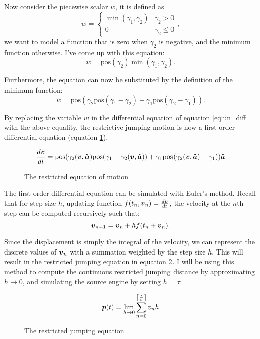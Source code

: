 Now consider the piecewise scalar $w$, it is defined as
\[
    w = \begin{cases}
        \min(\gamma_1, \gamma_2) & \gamma_2 > 0\\
        0 & \gamma_2 \le 0
    \end{cases},
\]
we want to model a function that is zero when $\gamma_2$ is negative, and the minimum function otherwise. I've come up with this equation:
\[
    w = \text{pos}(\gamma_2)\min(\gamma_1, \gamma_2).
\]

Furthermore, the equation can now be substituted by the definition of the minimum function:
\[
    w = \text{pos}(\gamma_2 \text{pos}(\gamma_1 - \gamma_2) + \gamma_1 \text{pos}(\gamma_2 - \gamma_1)).
\]

By replacing the variable $w$ in the differential equation of equation \ref{eq:un_diff} with the above equality, the restrictive jumping motion is now a first order differential equation (equation \ref{eq:reom}).

\begin{figure}[H]
    \centering
    \[
        \frac{d\tv}{dt} = \text{pos}(\gamma_2(\tv, \tunit{a}) \text{pos}(\gamma_1 - \gamma_2(\tv, \tunit{a})) + \gamma_1 \text{pos}(\gamma_2(\tv, \tunit{a}) - \gamma_1)) \tunit{a}
    \]
    \caption{The restricted equation of motion}
    \label{eq:reom}
\end{figure}

The first order differential equation can be simulated with Euler's method. Recall that for step size $h$, updating function $f(t_n, \tv_n) = \frac{d\tv}{dt}$, the velocity at the $n$th step can be computed recursively such that:
\[
    \tv_{n+1} = \tv_{n} + h f(t_n + \tv_n).
\]

Since the displacement is simply the integral of the velocity, we can represent the discrete values of $\tv_{n}$ with a summation weighted by the step size $h$. This will result in the restricted jumping equation in equation \ref{eq:rje}. I will be using this method to compute the continuous restricted jumping distance by approximating $h \to 0$, and simulating the source engine by setting $h = \tau$.

\begin{figure}[H]
    \centering
    \[
        \tp(t) = \lim_{h \to 0} \sum_{n=0}^{\ceil*{\frac{t}{h}}} v_{n} h
    \]
    \caption{The restricted jumping equation}
    \label{eq:rje}
\end{figure}


